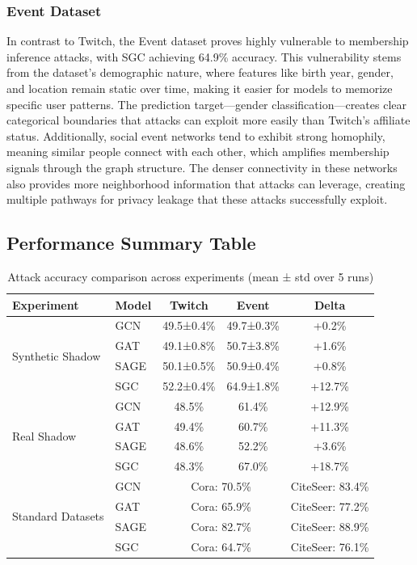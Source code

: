 \documentclass{article}
\begin{document}
\subsubsection{Event Dataset}
In contrast to Twitch, the Event dataset proves highly vulnerable to membership inference attacks, with SGC achieving 64.9\% accuracy. This vulnerability stems from the dataset's demographic nature, where features like birth year, gender, and location remain static over time, making it easier for models to memorize specific user patterns. The prediction target---gender classification---creates clear categorical boundaries that attacks can exploit more easily than Twitch's affiliate status. Additionally, social event networks tend to exhibit strong homophily, meaning similar people connect with each other, which amplifies membership signals through the graph structure. The denser connectivity in these networks also provides more neighborhood information that attacks can leverage, creating multiple pathways for privacy leakage that these attacks successfully exploit.

\subsection{Performance Summary Table}

\begin{table}[H]
\centering
\caption{Attack accuracy comparison across experiments (mean ± std over 5 runs)}
\label{tab:performance}
\begin{tabular}{|l|l|c|c|c|}
\hline
\textbf{Experiment} & \textbf{Model} & \textbf{Twitch} & \textbf{Event} & \textbf{Delta} \\
\hline
\multirow{4}{*}{Synthetic Shadow} & GCN & 49.5±0.4\% & 49.7±0.3\% & +0.2\% \\
 & GAT & 49.1±0.8\% & 50.7±3.8\% & +1.6\% \\
 & SAGE & 50.1±0.5\% & 50.9±0.4\% & +0.8\% \\
 & SGC & 52.2±0.4\% & 64.9±1.8\% & +12.7\% \\
\hline
\multirow{4}{*}{Real Shadow} & GCN & 48.5\% & 61.4\% & +12.9\% \\
 & GAT & 49.4\% & 60.7\% & +11.3\% \\
 & SAGE & 48.6\% & 52.2\% & +3.6\% \\
 & SGC & 48.3\% & 67.0\% & +18.7\% \\
\hline
\multirow{4}{*}{Standard Datasets} & GCN & \multicolumn{2}{c|}{Cora: 70.5\%} & CiteSeer: 83.4\% \\
 & GAT & \multicolumn{2}{c|}{Cora: 65.9\%} & CiteSeer: 77.2\% \\
 & SAGE & \multicolumn{2}{c|}{Cora: 82.7\%} & CiteSeer: 88.9\% \\
 & SGC & \multicolumn{2}{c|}{Cora: 64.7\%} & CiteSeer: 76.1\% \\
\hline
\end{tabular}
\end{table}
\end{document}
